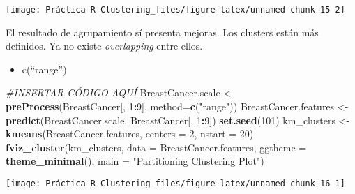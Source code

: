 \documentclass[
]{article}
\newenvironment{Shaded}{\begin{snugshade}}{\end{snugshade}}
\newcommand{\CommentTok}[1]{\textcolor[rgb]{0.56,0.35,0.01}{\textit{#1}}}
\newcommand{\DataTypeTok}[1]{\textcolor[rgb]{0.13,0.29,0.53}{#1}}
\newcommand{\DecValTok}[1]{\textcolor[rgb]{0.00,0.00,0.81}{#1}}
\newcommand{\KeywordTok}[1]{\textcolor[rgb]{0.13,0.29,0.53}{\textbf{#1}}}
\newcommand{\NormalTok}[1]{#1}
\newcommand{\OperatorTok}[1]{\textcolor[rgb]{0.81,0.36,0.00}{\textbf{#1}}}
\newcommand{\StringTok}[1]{\textcolor[rgb]{0.31,0.60,0.02}{#1}}
\providecommand{\tightlist}{%
  \setlength{\itemsep}{0pt}\setlength{\parskip}{0pt}}
\begin{document}
\begin{center}\texttt{[image: Práctica-R-Clustering\_files/figure-latex/unnamed-chunk-15-2]} \end{center}

El resultado de agrupamiento sí presenta mejoras. Los clusters están más
definidos. Ya no existe \emph{overlapping} entre ellos.

\begin{itemize}
\tightlist
\item
  c(``range'')
\end{itemize}

\begin{Shaded}
\begin{Highlighting}[]
\CommentTok{#INSERTAR CÓDIGO AQUÍ}
\NormalTok{BreastCancer.scale <-}\StringTok{ }\KeywordTok{preProcess}\NormalTok{(BreastCancer[, }\DecValTok{1}\OperatorTok{:}\DecValTok{9}\NormalTok{], }\DataTypeTok{method=}\KeywordTok{c}\NormalTok{(}\StringTok{"range"}\NormalTok{))}
\NormalTok{BreastCancer.features <-}\StringTok{ }\KeywordTok{predict}\NormalTok{(BreastCancer.scale, BreastCancer[, }\DecValTok{1}\OperatorTok{:}\DecValTok{9}\NormalTok{])}
\KeywordTok{set.seed}\NormalTok{(}\DecValTok{101}\NormalTok{)}
\NormalTok{km_clusters <-}\StringTok{ }\KeywordTok{kmeans}\NormalTok{(BreastCancer.features, }\DataTypeTok{centers =} \DecValTok{2}\NormalTok{, }\DataTypeTok{nstart =} \DecValTok{20}\NormalTok{)}
\KeywordTok{fviz_cluster}\NormalTok{(km_clusters, }\DataTypeTok{data =}\NormalTok{ BreastCancer.features,}
             \DataTypeTok{ggtheme =} \KeywordTok{theme_minimal}\NormalTok{(),}
             \DataTypeTok{main =} \StringTok{"Partitioning Clustering Plot"}\NormalTok{)}
\end{Highlighting}
\end{Shaded}

\begin{center}\texttt{[image: Práctica-R-Clustering\_files/figure-latex/unnamed-chunk-16-1]} \end{center}

\begin{Shaded}
\end{Shaded}
\end{document}
